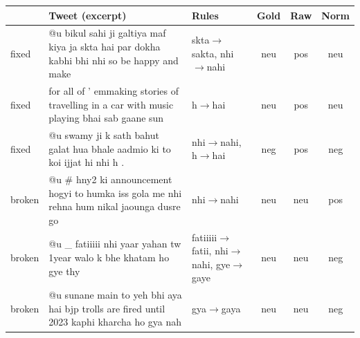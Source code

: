 \begin{tabular}{@{}l p{2.9cm} p{1.6cm} c c c@{}}
\toprule
 & Tweet (excerpt) & Rules & Gold & Raw & Norm\\
\midrule
fixed & \scriptsize @u bikul sahi ji galtiya maf kiya ja skta hai par dokha kabhi bhi nhi so be happy and make & \scriptsize skta$\to$sakta, nhi$\to$nahi & neu & pos & neu\\
fixed & \scriptsize for all of ' emmaking stories of travelling in a car with music playing bhai sab gaane sun & \scriptsize h$\to$hai & neu & pos & neu\\
fixed & \scriptsize @u swamy ji k sath bahut galat hua bhale aadmio ki to koi ijjat hi nhi h . & \scriptsize nhi$\to$nahi, h$\to$hai & neg & pos & neg\\
broken & \scriptsize @u \# hny2 ki announcement hogyi to humka iss gola me nhi rehna hum nikal jaounga dusre go & \scriptsize nhi$\to$nahi & neu & neu & pos\\
broken & \scriptsize @u \_ fatiiiii nhi yaar yahan tw 1year walo k bhe khatam ho gye thy & \scriptsize fatiiiii$\to$fatii, nhi$\to$nahi, gye$\to$gaye & neu & neu & neg\\
broken & \scriptsize @u sunane main to yeh bhi aya hai bjp trolls are fired until 2023 kaphi kharcha ho gya nah & \scriptsize gya$\to$gaya & neu & neu & neg\\
\bottomrule
\end{tabular}
